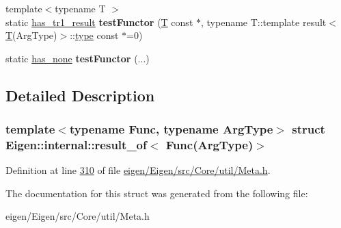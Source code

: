 \begin{DoxyCompactItemize}
{\footnotesize template$<$typename T $>$ }\\static \hyperlink{struct_eigen_1_1internal_1_1has__tr1__result}{has\+\_\+tr1\+\_\+result} {\bfseries test\+Functor} (\hyperlink{group___sparse_core___module}{T} const $\ast$, typename T\+::template result$<$ \hyperlink{group___sparse_core___module}{T}(Arg\+Type)$>$\+::\hyperlink{group___sparse_core___module}{type} const $\ast$=0)
\item 
\mbox{\label{struct_eigen_1_1internal_1_1result__of_3_01_func_07_arg_type_08_4_af6e85180ec6bbd25744ccdcba7382e78}} 
static \hyperlink{struct_eigen_1_1internal_1_1has__none}{has\+\_\+none} {\bfseries test\+Functor} (...)
\end{DoxyCompactItemize}


\subsection{Detailed Description}
\subsubsection*{template$<$typename Func, typename Arg\+Type$>$\newline
struct Eigen\+::internal\+::result\+\_\+of$<$ Func(\+Arg\+Type)$>$}



Definition at line \hyperlink{eigen_2_eigen_2src_2_core_2util_2_meta_8h_source_l00310}{310} of file \hyperlink{eigen_2_eigen_2src_2_core_2util_2_meta_8h_source}{eigen/\+Eigen/src/\+Core/util/\+Meta.\+h}.



The documentation for this struct was generated from the following file\+:\begin{DoxyCompactItemize}
\item 
eigen/\+Eigen/src/\+Core/util/\+Meta.\+h\end{DoxyCompactItemize}

